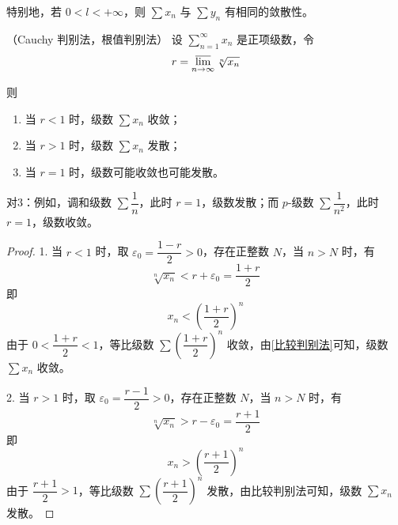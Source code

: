 特别地，若 $0 < l < +\infty$，则 $\sum x_n$ 与 $\sum y_n$ 有相同的敛散性。
\begin{proposition}
	（Cauchy 判别法，根值判别法）
	设 $\sum\limits_{n=1}^{\infty} x_n$ 是正项级数，令
	\[
	r = \varlimsup_{n \to \infty} \sqrt[n]{x_n}
	\]
	
	则
	\begin{enumerate}
		\item 当 $r < 1$ 时，级数 $\sum x_n$ 收敛；
		\item 当 $r > 1$ 时，级数 $\sum x_n$ 发散；
		\item 当 $r = 1$ 时，级数可能收敛也可能发散。
	\end{enumerate}
	
\end{proposition}

对3：例如，调和级数 $\sum \dfrac{1}{n}$，此时 $r=1$，级数发散；而 $p$-级数 $\sum \dfrac{1}{n^2}$，此时 $r=1$，级数收敛。
\begin{proof}
	1.  当 $r < 1$ 时，取 $\varepsilon_0 = \dfrac{1-r}{2} > 0$，存在正整数 $N$，当 $n > N$ 时，有
	\[
	\sqrt[n]{x_n} < r + \varepsilon_0 = \frac{1+r}{2}
	\]
	即
	\[
	x_n < \left( \frac{1+r}{2} \right)^n
	\]
	由于 $0 < \dfrac{1+r}{2} < 1$，等比级数 $\sum \left( \dfrac{1+r}{2} \right)^n$ 收敛，由\ref{比较判别法}可知，级数 $\sum x_n$ 收敛。
	
	2.  当 $r > 1$ 时，取 $\varepsilon_0 = \dfrac{r-1}{2} > 0$，存在正整数 $N$，当 $n > N$ 时，有
	\[
	\sqrt[n]{x_n} > r - \varepsilon_0 = \frac{r+1}{2}
	\]
	即
	\[
	x_n > \left( \frac{r+1}{2} \right)^n
	\]
	由于 $\dfrac{r+1}{2} > 1$，等比级数 $\sum \left( \dfrac{r+1}{2} \right)^n$ 发散，由比较判别法可知，级数 $\sum x_n$ 发散。
\end{proof}




